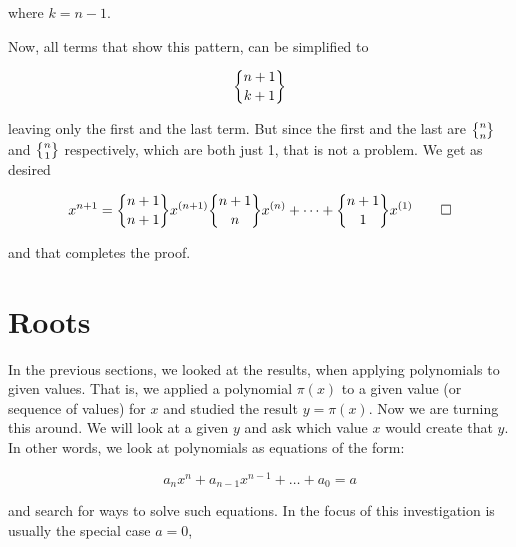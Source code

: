 \documentclass[tikz]{scrreprt}
\begin{document}
where $k = n-1$.

Now, all terms that show this pattern,
can be simplified to

\[
\stirlingTwo{n+1}{k+1}
\]

leaving only the first and the last term.
But since the first and the last are $\stirlingTwo{n}{n}$ and
$\stirlingTwo{n}{1}$ respectively, which are both just 1,
that is not a problem. We get as desired

\begin{equation}
x^{n+1} = \stirlingTwo{n+1}{n+1}x^{(n+1)}
          \stirlingTwo{n+1}{n}x^{(n)} + \dots + 
          \stirlingTwo{n+1}{1}x^{(1)}\qed
\end{equation}

and that completes the proof.



\section{Roots}

In the previous sections, we looked at the results,
when applying polynomials to given values.
That is, we applied a polynomial $\pi(x)$ to
a given value (or sequence of values) for $x$ 
and studied the result $y = \pi(x)$.
Now we are turning this around. We will look at
a given $y$ and ask which value $x$ would
create that $y$. In other words, 
we look at polynomials as equations of the form:

\begin{equation}
a_nx^n + a_{n-1}x^{n-1} + \dots + a_0 = a
\end{equation}

and search for ways to solve such equations.
In the focus of this investigation is usually
the special case $a=0$, \ie\:
\end{document}
